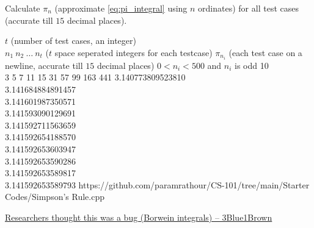 \documentclass[../../Problems]{subfiles}
\begin{document}
{%
Calculate $\pi_n$ (approximate \ref{eq:pi_integral} using $n$ ordinates) for all test cases (accurate till $15$ decimal places).%
\begin{testcases}
	{$t$ \hfill(number of test cases, an integer)\\$n_1\ n_2\ \ldots\ n_t$ \hfill($t$ space seperated integers for each testcase)}
	{$\pi_{n_i}$ \hfill(each test case on a newline, accurate till $15$ decimal places)}
	{$0 < n_i < 500$ and $n_i$ is odd}
	{10\\3 5 7 11 15 31 57 99 163 441}
	{3.140773809523810\\3.141684884891457\\3.141601987350571\\3.141593090129691\\3.141592711563659\\3.141592654188570\\3.141592653603947\\3.141592653590286\\3.141592653589817\\3.141592653589793}
	{https://github.com/paramrathour/CS-101/tree/main/Starter Codes/Simpson's Rule.cpp}
\end{testcases}
\begin{funvideo}
\href{https://youtu.be/851U557j6HE}{Researchers thought this was a bug (Borwein integrals) -- 3Blue1Brown}
\end{funvideo}
}
\end{document}
